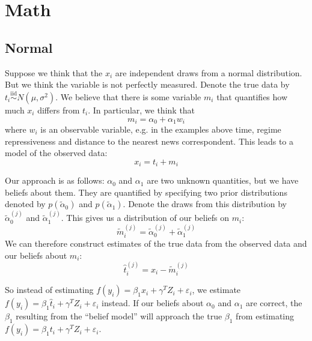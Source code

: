 \documentclass[fignum,letterpaper,12pt]{article}
\newcommand{\iid}{\stackrel{\mathrm{iid}}{\sim}}
\begin{document}
\section{Math}

\subsection{Normal}
Suppose we think that the $x_i$ are independent draws from a normal distribution. But we think the variable is not perfectly measured. Denote the true data by $t_i \iid N(\mu, \sigma^2)$. We believe that there is some variable $m_i$ that quantifies how much $x_i$ differs from $t_i$. In particular, we think that
\begin{equation}
m_i = \alpha_0 + \alpha_1 w_i
\end{equation} 
where $w_i$ is an observable variable, e.g. in the examples above time, regime repressiveness and distance to the nearest news correspondent. This leads to a model of the observed data:
\begin{equation}
x_i = t_i + m_i
\end{equation} 
\newline{}

Our approach is as follows: $\alpha_0$ and $\alpha_1$ are two unknown quantities, but we have beliefs about them. They are quantified by specifying two prior distributions denoted by $p(\tilde \alpha_0)$ and $p(\tilde \alpha_1)$. Denote the draws from this distribution by $\tilde \alpha_0^{(j)}$ and  $\tilde \alpha_1^{(j)}$. This gives us a distribution of our beliefs on $m_i$:
\begin{equation}
\tilde m_i^{(j)} = \tilde \alpha_0^{(j)} + \tilde \alpha_1^{(j)}
\end{equation} 
We can therefore construct estimates of the true data from the observed data and our beliefs about $m_i$:
\begin{equation}
\hat t_i^{(j)} = x_i - \tilde m_i^{(j)}
\end{equation} 
\newline{}

So instead of estimating $f(y_i)=\beta_1 x_i + \gamma^T Z_i + \varepsilon_i$, we estimate $f(y_i)=\beta_1 \hat t_i + \gamma^T Z_i + \varepsilon_i$ instead. If our beliefs about $\alpha_0$ and $\alpha_1$ are correct, the $\beta_1$ resulting from the ``belief model'' will approach the true $\beta_1$ from estimating $f(y_i)=\beta_1 t_i + \gamma^T Z_i + \varepsilon_i$.
\end{document}

